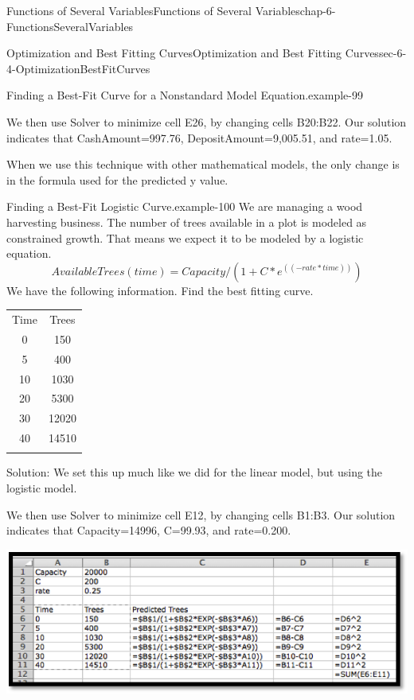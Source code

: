 \documentclass[oneside,10pt,]{book}
\numberwithin{equation}{section}
\newcommand{\hrulethin}  {\noalign{\hrule height 0.04em}}
\newcommand{\hrulethick} {\noalign{\hrule height 0.11em}}
\begin{document}
\begin{chapterptx}{Functions of Several Variables}{}{Functions of Several Variables}{}{}{chap-6-FunctionsSeveralVariables}
\begin{sectionptx}{Optimization and Best Fitting Curves}{}{Optimization and Best Fitting Curves}{}{}{sec-6-4-OptimizationBestFitCurves}
\begin{example}{Finding a Best-Fit Curve for a Nonstandard Model Equation.}{example-99}
\begin{sidebyside}{1}{0.1}{0.1}{0}
\begin{sbspanel}{0.8}
\end{sbspanel}%
\end{sidebyside}%
\par
\hypertarget{p-2464}{}%
We then use Solver to minimize cell E26, by changing cells B20:B22.  Our solution indicates that CashAmount=\textdollar{}997.76, DepositAmount=\textdollar{}9,005.51, and rate=1.05.%
\end{example}
\hypertarget{p-2465}{}%
When we use this technique with other mathematical models, the only change is in the formula used for the predicted y value.%
\begin{example}{Finding a Best-Fit Logistic Curve.}{example-100}%
\hypertarget{p-2466}{}%
We are managing a wood harvesting business.  The number of trees available in a plot is modeled as constrained growth.  That means we expect it to be modeled by a logistic equation.%
%
\begin{equation*}
AvailableTrees(time)=Capacity/(1+C*e^((-rate*time)) )
\end{equation*}
\hypertarget{p-2467}{}%
We have the following information.  Find the best fitting curve.%
\begin{sidebyside}{1}{0}{0}{0}%
\begin{sbspanel}{1}%
{\centering%
\begin{tabular}{cc}\hrulethick
Time&Trees\tabularnewline\hrulethin
0&150\tabularnewline\hrulethin
5&400\tabularnewline\hrulethin
10&1030\tabularnewline\hrulethin
20&5300\tabularnewline\hrulethin
30&12020\tabularnewline\hrulethin
40&14510\tabularnewline\hrulethin
\end{tabular}
\par}
\end{sbspanel}%
\end{sidebyside}%
\par
\hypertarget{p-2468}{}%
Solution:  We set this up much like we did for the linear model, but using the logistic model.%
\par
\hypertarget{p-2469}{}%
We then use Solver to minimize cell E12, by changing cells B1:B3.  Our solution indicates that Capacity=14996, C=99.93, and rate=0.200.%
\begin{sidebyside}{1}{0.1}{0.1}{0}%
\begin{sbspanel}{0.8}%
\includegraphics[width=1\linewidth]{images/sec-6-4-7.png}

\end{sbspanel}
\end{sidebyside}
\end{example}
\end{sectionptx}
\end{chapterptx}
\end{document}
